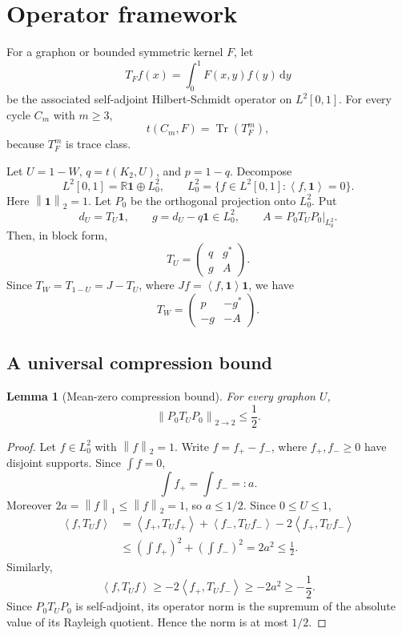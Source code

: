 \documentclass[11pt]{article}
\newtheorem{lemma}[theorem]{Lemma}
\theoremstyle{definition}
\theoremstyle{remark}
\newcommand{\one}{\mathbf 1}
\newcommand{\R}{\mathbb R}
\newcommand{\Tr}{\operatorname{Tr}}
\newcommand{\ip}[2]{\left\langle #1,#2\right\rangle}
\newcommand{\norm}[1]{\left\lVert #1\right\rVert}
\newcommand{\dd}{\,\mathrm d}
\newcommand{\0}{\mathbf 0}
\begin{document}
\section{Operator framework}

For a graphon or bounded symmetric kernel $F$, let
\[
        T_F f(x)=\int_0^1 F(x,y)f(y)\dd y
\]
be the associated self-adjoint Hilbert-Schmidt operator on $L^2[0,1]$.  For every cycle $C_m$ with $m\ge3$,
\[
        t(C_m,F)=\Tr(T_F^m),
\]
because $T_F^m$ is trace class.

Let $U=1-W$, $q=t(K_2,U)$, and $p=1-q$.  Decompose
\[
        L^2[0,1]=\R\one\oplus L^2_0,
        \qquad
        L^2_0=\{f\in L^2[0,1]:\ip{f}{\one}=0\}.
\]
Here $\norm{\one}_2=1$.  Let $P_0$ be the orthogonal projection onto $L^2_0$.  Put
\[
        d_U=T_U\one,
        \qquad
        g=d_U-q\one\in L^2_0,
        \qquad
        A=P_0T_UP_0|_{L^2_0}.
\]
Then, in block form,
\begin{equation}\label{eq:block-TU}
        T_U=\begin{pmatrix}
        q & g^*\\
        g & A
        \end{pmatrix}.
\end{equation}
Since $T_W=T_{1-U}=J-T_U$, where $Jf=\ip{f}{\one}\one$, we have
\begin{equation}\label{eq:block-TW}
        T_W=\begin{pmatrix}
        p & -g^*\\
        -g & -A
        \end{pmatrix}.
\end{equation}

\subsection{A universal compression bound}

\begin{lemma}[Mean-zero compression bound]\label{lem:compression-half}
For every graphon $U$,
\[
        \norm{P_0T_UP_0}_{2\to2}\le \frac12.
\]
\end{lemma}

\begin{proof}
Let $f\in L^2_0$ with $\norm f_2=1$.  Write $f=f_+-f_-$, where $f_+,f_-\ge0$ have disjoint supports.  Since $\int f=0$,
\[
        \int f_+=\int f_-=:a.
\]
Moreover $2a=\norm f_1\le \norm f_2=1$, so $a\le1/2$.  Since $0\le U\le1$,
\begin{align*}
\ip{f}{T_Uf}
&=\ip{f_+}{T_Uf_+}+\ip{f_-}{T_Uf_-}-2\ip{f_+}{T_Uf_-}\\
&\le \left(\int f_+\right)^2+\left(\int f_-\right)^2
=2a^2\le\frac12.
\end{align*}
Similarly,
\[
        \ip{f}{T_Uf}\ge -2\ip{f_+}{T_Uf_-}\ge -2a^2\ge-\frac12.
\]
Since $P_0T_UP_0$ is self-adjoint, its operator norm is the supremum of the absolute value of its Rayleigh quotient.  Hence the norm is at most $1/2$.
\end{proof}
\end{document}
